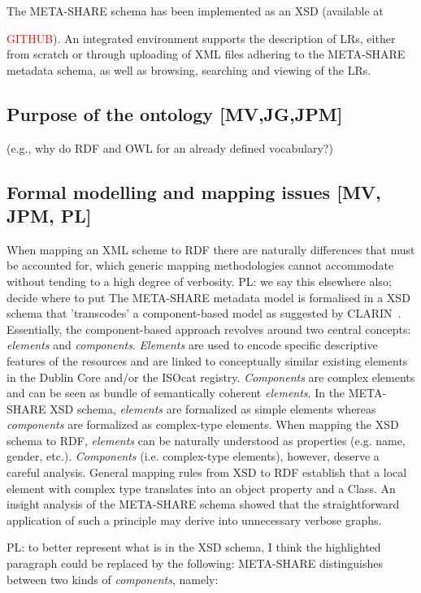 \documentclass{llncs}
\begin{document}
The META-SHARE schema has been implemented as an XSD (available at {\textcolor{red}{GITHUB}). An integrated environment supports the description of LRs, either from scratch or through uploading of XML files adhering to the META-SHARE metadata schema, as well as browsing, searching and viewing of the LRs.
\subsection{Purpose of the ontology [MV,JG,JPM]}
\label{sec:purpose}
(e.g., why do RDF and OWL for an already defined vocabulary?)
\subsection{Formal modelling and mapping issues [MV, JPM, PL]}
When mapping an XML scheme to RDF there are naturally differences that must be
accounted for, which generic mapping methodologies cannot accommodate without
tending to a high degree of verbosity.
{PL: we say this elsewhere also; decide where to put}
The META-SHARE metadata model is formalised in a XSD schema that 'transcodes' a component-based model as suggested by CLARIN~\cite{broeder2012cmdi}. Essentially, the component-based approach revolves around two central concepts: \emph{elements} and \emph{components}. \emph{Elements} are used to encode specific descriptive features of the resources and are linked to conceptually similar existing elements in the Dublin Core and/or the ISOcat registry. \emph{Components} are complex elements and can be seen as bundle of semantically coherent \emph{elements}.
In the META-SHARE XSD schema, \emph{elements} are formalized as simple elements whereas \emph{components} are formalized as complex-type elements. When mapping the XSD schema to RDF, \emph{elements} can be naturally understood as properties (e.g. name, gender, etc.). \emph{Components} (i.e. complex-type elements), however, deserve a careful analysis. General mapping rules from XSD to RDF establish that a local element with complex type translates into an object property and a Class. An insight analysis of the META-SHARE schema showed that the straightforward application of such a principle may derive into unnecessary verbose graphs.
{PL: to better represent what is in the XSD schema, I think the highlighted paragraph could be replaced by the following:
META-SHARE distinguishes between two kinds of \emph{components}, namely: 
\begin{itemize}

\end{itemize}}}
\end{document}
